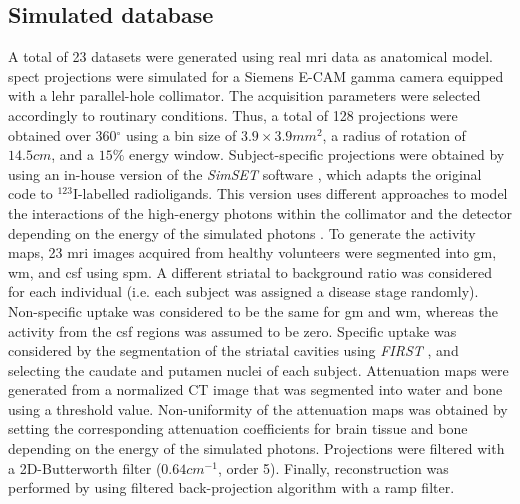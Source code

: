\documentclass{frontiers}
\newcommand{\degree}{\ensuremath{^{\circ}}}
\begin{document}
\subsection{Simulated database} %
\label{sec:data_simulated}
\cbstart
A total of 23 datasets were generated using real \gls*{mri} data as
  anatomical model.
\cbend
\Gls*{spect} projections were simulated for a Siemens E-CAM gamma
  camera equipped with a \acrlong*{lehr} parallel-hole collimator.
The acquisition parameters were selected accordingly to routinary conditions.
Thus, a total of 128 projections were obtained over 360{\degree} using a
  bin size of $3.9\times3.9mm^{2}$, a radius of rotation of $14.5cm$, and
  a $15\%$ energy window.
Subject-specific projections were obtained by using an in-house version
  \citep{crespo_quantification_2008} of the \emph{SimSET} software
  \citep{harrison_preliminary_1993}, which adapts the original code
  to $^{123}$I-labelled radioligands.
This version uses different approaches to model the interactions of
  the high-energy photons within the collimator and the detector depending
  on the energy of the simulated photons 
  \citep{cot_study_2004, cot_modeling_2006}.
To generate the activity maps, 23 \gls*{mri} images acquired from healthy
  volunteers were segmented into \gls*{gm}, \gls*{wm}, and \gls*{csf}
  using \gls*{spm}.
A different striatal to background ratio was considered for each individual
  (i.e. each subject was assigned a disease stage randomly).
Non-specific uptake was considered to be the same for \gls*{gm} and \gls*{wm},
  whereas the activity from the \gls*{csf} regions was assumed to be zero.
Specific uptake was considered by the segmentation of the striatal cavities
  using \emph{FIRST} \citep{patenaude_bayesian_2011},
  and selecting the caudate and putamen nuclei of each subject.
Attenuation maps were generated from a normalized CT image that was
  segmented into water and bone using a threshold value.
Non-uniformity of the attenuation maps was obtained by setting the
  corresponding attenuation coefficients for brain tissue and bone
  depending on the energy of the simulated photons.
Projections were filtered with a 2D-Butterworth filter ($0.64cm^{-1}$,
  order 5). Finally, reconstruction was performed by using filtered 
  back-projection algorithm with a ramp filter.
\end{document}

